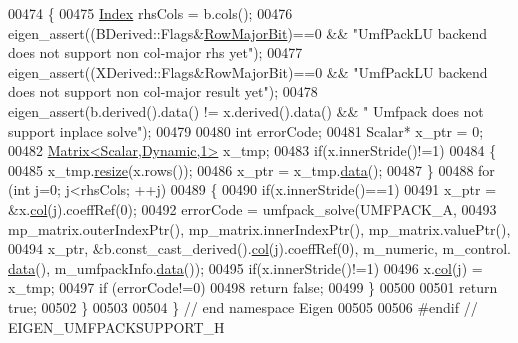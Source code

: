 \begin{DoxyCode}
00474 \textcolor{keyword}{}\{
00475   \hyperlink{namespace_eigen_a62e77e0933482dafde8fe197d9a2cfde}{Index} rhsCols = b.cols();
00476   eigen\_assert((BDerived::Flags&\hyperlink{group__flags_gae4f56c2a60bbe4bd2e44c5b19cbe8762}{RowMajorBit})==0 && \textcolor{stringliteral}{"UmfPackLU backend does not support non
       col-major rhs yet"});
00477   eigen\_assert((XDerived::Flags&RowMajorBit)==0 && \textcolor{stringliteral}{"UmfPackLU backend does not support non col-major result
       yet"});
00478   eigen\_assert(b.derived().data() != x.derived().data() && \textcolor{stringliteral}{" Umfpack does not support inplace solve"});
00479 
00480   \textcolor{keywordtype}{int} errorCode;
00481   Scalar* x\_ptr = 0;
00482   \hyperlink{group___core___module}{Matrix<Scalar,Dynamic,1>} x\_tmp;
00483   \textcolor{keywordflow}{if}(x.innerStride()!=1)
00484   \{
00485     x\_tmp.\hyperlink{class_eigen_1_1_plain_object_base_a99d9054ee2d5a40c6e00ded0265e9cea}{resize}(x.rows());
00486     x\_ptr = x\_tmp.\hyperlink{class_eigen_1_1_plain_object_base_ac25699535374b1854cf8494e44ad31b2}{data}();
00487   \}
00488   \textcolor{keywordflow}{for} (\textcolor{keywordtype}{int} j=0; j<rhsCols; ++j)
00489   \{
00490     \textcolor{keywordflow}{if}(x.innerStride()==1)
00491       x\_ptr = &x.\hyperlink{group___core___module_a469583ed90462820888344e63ebe1a80}{col}(j).coeffRef(0);
00492     errorCode = umfpack\_solve(UMFPACK\_A,
00493         mp\_matrix.outerIndexPtr(), mp\_matrix.innerIndexPtr(), mp\_matrix.valuePtr(),
00494         x\_ptr, &b.const\_cast\_derived().\hyperlink{group___core___module_a469583ed90462820888344e63ebe1a80}{col}(j).coeffRef(0), m\_numeric, m\_control.
      \hyperlink{class_eigen_1_1_plain_object_base_ac25699535374b1854cf8494e44ad31b2}{data}(), m\_umfpackInfo.\hyperlink{class_eigen_1_1_plain_object_base_ac25699535374b1854cf8494e44ad31b2}{data}());
00495     \textcolor{keywordflow}{if}(x.innerStride()!=1)
00496       x.\hyperlink{group___core___module_a469583ed90462820888344e63ebe1a80}{col}(j) = x\_tmp;
00497     \textcolor{keywordflow}{if} (errorCode!=0)
00498       \textcolor{keywordflow}{return} \textcolor{keyword}{false};
00499   \}
00500 
00501   \textcolor{keywordflow}{return} \textcolor{keyword}{true};
00502 \}
00503 
00504 \} \textcolor{comment}{// end namespace Eigen}
00505 
00506 \textcolor{preprocessor}{#endif // EIGEN\_UMFPACKSUPPORT\_H}
\end{DoxyCode}

